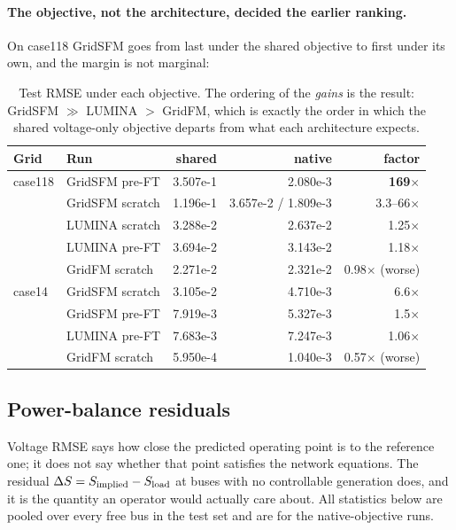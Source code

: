 \documentclass[10pt]{article}
\begin{document}
\paragraph{The objective, not the architecture, decided the earlier ranking.}
On case118 GridSFM goes from last under the shared objective to first under its
own, and the margin is not marginal:

\begin{table}[H]
\centering
\small
\begin{tabular}{llrrr}
\toprule
Grid & Run & shared & native & factor \\
\midrule
case118 & GridSFM pre-FT  & 3.507e-1 & 2.080e-3 & \textbf{169\(\times\)} \\
        & GridSFM scratch & 1.196e-1 & 3.657e-2 / 1.809e-3 & 3.3--66\(\times\) \\
        & LUMINA scratch  & 3.288e-2 & 2.637e-2 & 1.25\(\times\) \\
        & LUMINA pre-FT   & 3.694e-2 & 3.143e-2 & 1.18\(\times\) \\
        & GridFM scratch  & 2.271e-2 & 2.321e-2 & 0.98\(\times\) (worse) \\
\midrule
case14  & GridSFM scratch & 3.105e-2 & 4.710e-3 & 6.6\(\times\) \\
        & GridSFM pre-FT  & 7.919e-3 & 5.327e-3 & 1.5\(\times\) \\
        & LUMINA pre-FT   & 7.683e-3 & 7.247e-3 & 1.06\(\times\) \\
        & GridFM scratch  & 5.950e-4 & 1.040e-3 & 0.57\(\times\) (worse) \\
\bottomrule
\end{tabular}
\caption{Test RMSE under each objective. The ordering of the \emph{gains} is the
result: GridSFM \(\gg\) LUMINA \(>\) GridFM, which is exactly the order in which
the shared voltage-only objective departs from what each architecture expects.}
\end{table}

\subsection*{Power-balance residuals}
\label{sec:resid}

Voltage RMSE says how close the predicted operating point is to the reference
one; it does not say whether that point satisfies the network equations. The
residual \(\Delta S = S_{\rm implied} - S_{\rm load}\) at buses with no
controllable generation does, and it is the quantity an operator would actually
care about. All statistics below are pooled over every free bus in the test set
and are for the native-objective runs.
\end{document}
